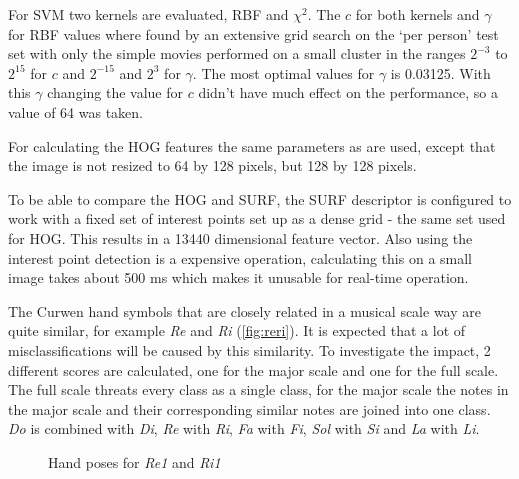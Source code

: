 For SVM two kernels are evaluated, RBF and $\chi^2$. The $c$ for both kernels and $\gamma$ for RBF values where found by an extensive grid search on the `per person' test set with only the simple movies performed on a small cluster in the ranges $2^{-3}$ to $2^{15}$ for $c$ and $2^{-15}$ and $2^3$ for $\gamma$. The most optimal values for $\gamma$ is 0.03125. With this $\gamma$ changing the value for $c$ didn't have much effect on the performance, so a value of 64 was taken.

For calculating the HOG features the same parameters as \citep{watanabe2009} are used, except that the image is not resized to 64 by 128 pixels, but 128 by 128 pixels.

To be able to compare the HOG and SURF, the SURF descriptor is configured to work with a fixed set of interest points set up as a dense grid - the same set used for HOG. This results in a 13440 dimensional feature vector. Also using the interest point detection is a expensive operation, calculating this on a small image takes about 500 ms which makes it unusable for real-time operation.

The Curwen hand symbols that are closely related in a musical scale way are quite similar, for example \emph{Re} and \emph{Ri} (\autoref{fig:reri}). It is expected that a lot of misclassifications will be caused by this similarity. To investigate the impact, 2 different scores are calculated, one for the major scale and one for the full scale. The full scale threats every class as a single class, for the major scale the notes in the major scale and their corresponding similar notes are joined into one class. \emph{Do} is combined with \emph{Di}, \emph{Re} with \emph{Ri}, \emph{Fa} with \emph{Fi}, \emph{Sol} with \emph{Si} and \emph{La} with \emph{Li}.


\begin{figure}[tb]
  \centering
{}
\hspace{0.03\linewidth}
  \caption{Hand poses for \emph{Re1} and \emph{Ri1}}
  \label{fig:reri}
\end{figure}


